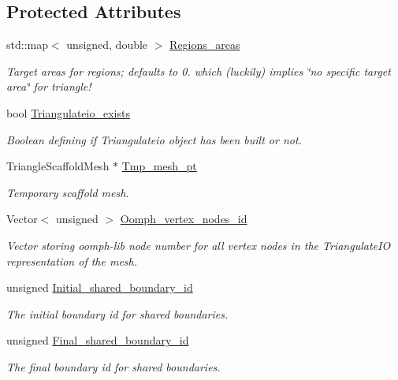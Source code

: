 \subsection*{Protected Attributes}
\begin{DoxyCompactItemize}
\item 
std\+::map$<$ unsigned, double $>$ \hyperlink{classoomph_1_1TriangleMesh_a26e357b1993ee77e390aa3b246c1e12b}{Regions\+\_\+areas}
\begin{DoxyCompactList}\small\item\em Target areas for regions; defaults to 0. which (luckily) implies \char`\"{}no specific target area\char`\"{} for triangle! \end{DoxyCompactList}\item 
bool \hyperlink{classoomph_1_1TriangleMesh_a6675edf7227a8ae62d7c13c8b406842b}{Triangulateio\+\_\+exists}
\begin{DoxyCompactList}\small\item\em Boolean defining if Triangulateio object has been built or not. \end{DoxyCompactList}\item 
Triangle\+Scaffold\+Mesh $\ast$ \hyperlink{classoomph_1_1TriangleMesh_a0c0fd18f3ec5d004370ba590d6c952d4}{Tmp\+\_\+mesh\+\_\+pt}
\begin{DoxyCompactList}\small\item\em Temporary scaffold mesh. \end{DoxyCompactList}\item 
Vector$<$ unsigned $>$ \hyperlink{classoomph_1_1TriangleMesh_a9fc2a4cae497a1b626293831b9824ca5}{Oomph\+\_\+vertex\+\_\+nodes\+\_\+id}
\begin{DoxyCompactList}\small\item\em Vector storing oomph-\/lib node number for all vertex nodes in the Triangulate\+IO representation of the mesh. \end{DoxyCompactList}\item 
unsigned \hyperlink{classoomph_1_1TriangleMesh_a2a450374603e117c534221c13e2cae86}{Initial\+\_\+shared\+\_\+boundary\+\_\+id}
\begin{DoxyCompactList}\small\item\em The initial boundary id for shared boundaries. \end{DoxyCompactList}\item 
unsigned \hyperlink{classoomph_1_1TriangleMesh_abb552c8115f5e4aea9138379a0523493}{Final\+\_\+shared\+\_\+boundary\+\_\+id}
\begin{DoxyCompactList}\small\item\em The final boundary id for shared boundaries. \end{DoxyCompactList}\item 

\end{DoxyCompactItemize}
